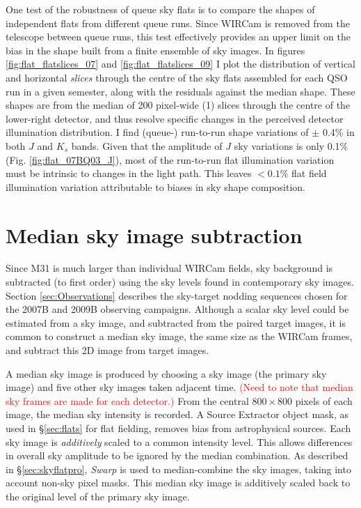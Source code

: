\documentclass[iop]{emulateapj}
\newcommand{\sw}[1]{\textit{#1}} %
\newcommand{\changeit}[1]{\textcolor{red}{#1}} %
\begin{document}
One test of the robustness of queue sky flats is to compare the shapes of independent flats from different queue runs. Since WIRCam is removed from the telescope between queue runs, this test effectively provides an upper limit on the bias in the shape built from a finite ensemble of sky images. In figures \ref{fig:flat_flatslices_07} and \ref{fig:flat_flatslices_09} I plot the distribution of vertical and horizontal \emph{slices} through the centre of the sky flats assembled for each QSO run in a given semester, along with the residuals against the median shape. These shapes are from the median of 200 pixel-wide (1\arcmin) slices through the centre of the lower-right detector, and thus resolve specific changes in the perceived detector illumination distribution. I find (queue-) run-to-run shape variations of $\pm$ 0.4\% in both $J$ and $K_s$ bands. Given that the amplitude of $J$ sky variations is only 0.1\% (Fig. \ref{fig:flat_07BQ03_J}), most of the run-to-run flat illumination variation must be intrinsic to changes in the light path. This leaves $<0.1$\% flat field illumination variation attributable to biases in sky shape composition.

\section{Median sky image subtraction} %
\label{sec:mediansky}

Since M31 is much larger than individual WIRCam fields, sky background is subtracted (to first order) using the sky levels found in contemporary sky images. Section \ref{sec:Observations} describes the sky-target nodding sequences chosen for the 2007B and 2009B observing campaigns. Although a scalar sky level could be estimated from a sky image, and subtracted from the paired target images, it is common to construct a median sky image, the same size as the WIRCam frames, and subtract this 2D image from target images.

A median sky image is produced by choosing a sky image (the primary sky image) and five other sky images taken adjacent time. \changeit{(Need to note that median sky frames are made for each detector.)} From the central $800\times 800$ pixels of each image, the median sky intensity is recorded. A Source Extractor object mask, as used in \S \ref{sec:flats} for flat fielding, removes bias from astrophysical sources. Each sky image is \emph{additively} scaled to a common intensity level. This allows differences in overall sky amplitude to be ignored by the median combination. As described in \S \ref{sec:skyflatpro}, \sw{Swarp} is used to median-combine the sky images, taking into account non-sky pixel masks. This median sky image is additively scaled back to the original level of the primary sky image.
\end{document}
